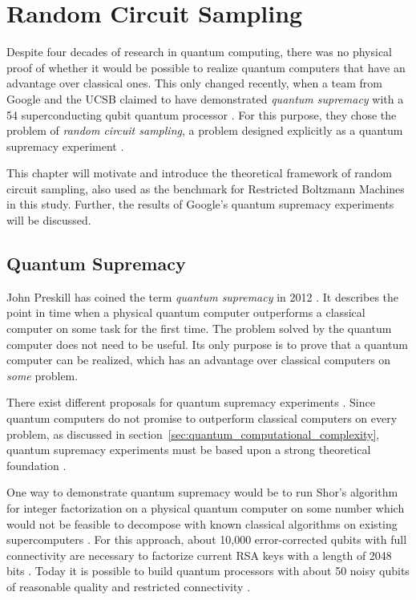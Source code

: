 \chapter{Random Circuit Sampling}
\label{sec:rcs}

Despite four decades
of research in quantum computing, 
there was no physical proof of whether it would be possible to realize quantum computers
that have an advantage over classical ones. This only changed
recently, when a team from Google and the UCSB claimed to have demonstrated \textit{quantum supremacy}
with a 54 superconducting qubit quantum processor \cite{martines2019supremacy}. For this purpose, they
chose the problem of \textit{random circuit sampling}, a problem designed explicitly
as a quantum supremacy experiment \cite{Boixo2018supremacy}.

This chapter will motivate and introduce the theoretical framework of random circuit
sampling, also used as the benchmark for Restricted Boltzmann Machines in this
study. Further, the results of Google's quantum supremacy experiments will be discussed.

\section{Quantum Supremacy}

John Preskill has coined the term \textit{quantum supremacy} in 2012
\cite{preskill2012quantum}. It describes the point in time when a physical quantum computer
outperforms a classical computer on some task for the first time. The problem
solved by the quantum computer does not need to be useful. Its only purpose is
to prove that a quantum computer can be realized, which has an advantage over
classical computers on \textit{some} problem.

There exist different proposals for quantum supremacy
experiments \cite{shor1997factorisation, aaronson2013boson, Boixo2018supremacy}. Since quantum computers do not promise to outperform classical
computers on every problem, as discussed in section~\ref{sec:quantum_computational_complexity}, 
quantum supremacy experiments must be based upon a strong theoretical foundation \cite{Bernstein93quantumcomplexity}.

One way to demonstrate quantum supremacy would be to run Shor's
algorithm for integer factorization \cite{shor1997factorisation} on a physical quantum computer on some number which would not be feasible
to decompose with known classical algorithms on existing supercomputers \cite{martinlopez2011experimental}. 
For this approach, about 10,000 error-corrected qubits with full connectivity are necessary to factorize current 
RSA keys with a length of 2048 bits \cite{Barker15nistspecial,shor1997factorisation}. Today it is possible to
build quantum processors with about 50 noisy qubits of reasonable quality and restricted connectivity \cite{martines2019supremacy}.

